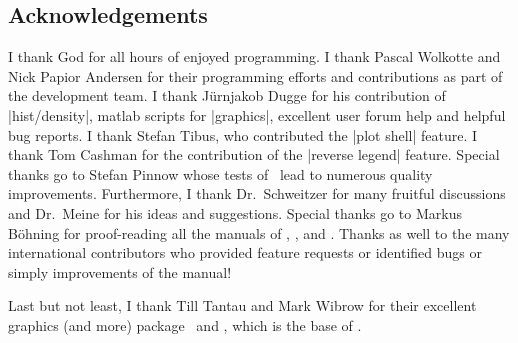 \subsection{Acknowledgements}
I thank God for all hours of enjoyed programming. I thank Pascal Wolkotte and Nick Papior Andersen for their programming efforts and contributions as part of the development team. I thank J\"urnjakob Dugge for his contribution of |hist/density|, matlab scripts for  |graphics|, excellent user forum help and helpful bug reports. I thank Stefan Tibus, who contributed the |plot shell| feature. I thank Tom Cashman for the contribution of the |reverse legend| feature. Special thanks go to Stefan Pinnow whose tests of \PGFPlots\ lead to numerous quality improvements. Furthermore, I thank Dr.~Schweitzer for many fruitful discussions and Dr.~Meine for his ideas and suggestions. Special thanks go to Markus B\"ohning for proof-reading all the manuals of \PGF, \PGFPlots, and \PGFPlotstable. Thanks as well to the many international contributors who provided feature requests or identified bugs or simply improvements of the manual!

Last but not least, I thank Till Tantau and Mark Wibrow for their excellent graphics (and more) package \PGF\ and \Tikz, which is the base of \PGFPlots.

